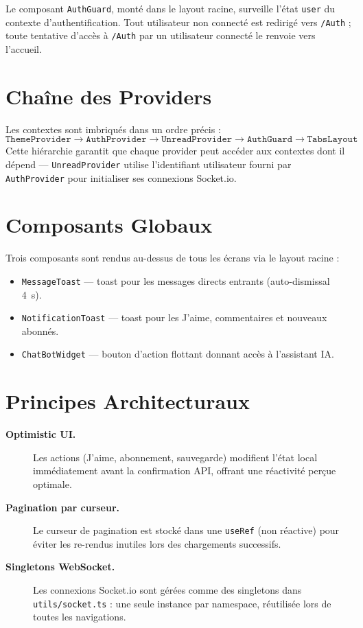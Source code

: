 Le composant \texttt{AuthGuard}, monté dans le layout racine, surveille l'état \texttt{user} du contexte d'authentification. Tout utilisateur non connecté est redirigé vers \texttt{/Auth} ; toute tentative d'accès à \texttt{/Auth} par un utilisateur connecté le renvoie vers l'accueil.

\section{Chaîne des Providers}

Les contextes sont imbriqués dans un ordre précis :
\[
\texttt{ThemeProvider} \to \texttt{AuthProvider} \to \texttt{UnreadProvider} \to \texttt{AuthGuard} \to \texttt{TabsLayout}
\]
Cette hiérarchie garantit que chaque provider peut accéder aux contextes dont il dépend — \texttt{UnreadProvider} utilise l'identifiant utilisateur fourni par \texttt{AuthProvider} pour initialiser ses connexions Socket.io.

\section{Composants Globaux}

Trois composants sont rendus au-dessus de tous les écrans via le layout racine :
\begin{itemize}
  \item \texttt{MessageToast} — toast pour les messages directs entrants (auto-dismissal 4~s).
  \item \texttt{NotificationToast} — toast pour les J'aime, commentaires et nouveaux abonnés.
  \item \texttt{ChatBotWidget} — bouton d'action flottant donnant accès à l'assistant IA.
\end{itemize}

\section{Principes Architecturaux}

\begin{description}
  \item[\textbf{Optimistic UI.}] Les actions (J'aime, abonnement, sauvegarde) modifient l'état local immédiatement avant la confirmation API, offrant une réactivité perçue optimale.
  \item[\textbf{Pagination par curseur.}] Le curseur de pagination est stocké dans une \texttt{useRef} (non réactive) pour éviter les re-rendus inutiles lors des chargements successifs.
  \item[\textbf{Singletons WebSocket.}] Les connexions Socket.io sont gérées comme des singletons dans \texttt{utils/socket.ts} : une seule instance par namespace, réutilisée lors de toutes les navigations.
\end{description}
